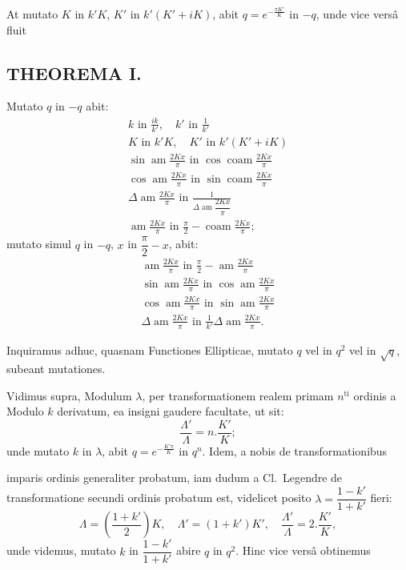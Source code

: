 \documentclass{article}
\begin{document}
At mutato $K$ in $k'K$, $K'$ in $k'(K'+iK)$, abit $q=e^{-\frac{\pi K'}{K}}$ in $-q$, unde vice versâ fluit

\subsection*{THEOREMA I.}

Mutato $q$ in $-q$ abit:
\[
\begin{gathered}
k\text{ in }\frac{ik}{k'},\quad k'\text{ in }\frac{1}{k'}
\\[2ex]
K\text{ in }k'K,\quad K'\text{ in }k'(K'+iK)
\\[2ex]
\sin\operatorname{am}\frac{2Kx}{\pi}\text{ in }\cos\operatorname{coam}\frac{2Kx}{\pi}
\\[2ex]
\cos\operatorname{am}\frac{2Kx}{\pi}\text{ in }\sin\operatorname{coam}\frac{2Kx}{\pi}
\\[2ex]
\Delta\operatorname{am}\frac{2Kx}{\pi}\text{ in }\frac{1}{\Delta\operatorname{am}\dfrac{2Kx}{\pi}}
\\[2ex]
\operatorname{am}\frac{2Kx}{\pi}\text{ in }\frac{\pi}{2}-\operatorname{coam}\frac{2Kx}{\pi};
\end{gathered}
\]
mutato simul $q$ in $-q$, $x$ in $\dfrac{\pi}{2}-x$, abit:
\[
\begin{gathered}
\operatorname{am}\frac{2Kx}{\pi}\text{ in }\frac{\pi}{2}-\operatorname{am}\frac{2Kx}{\pi}
\\[2ex]
\sin\operatorname{am}\frac{2Kx}{\pi}\text{ in }\cos\operatorname{am}\frac{2Kx}{\pi}
\\[2ex]
\cos\operatorname{am}\frac{2Kx}{\pi}\text{ in }\sin\operatorname{am}\frac{2Kx}{\pi}
\\[2ex]
\Delta\operatorname{am}\frac{2Kx}{\pi}\text{ in }\frac{1}{k'}\Delta\operatorname{am}\frac{2Kx}{\pi}.
\end{gathered}
\]

Inquiramus adhuc, quasnam Functiones Ellipticae, mutato $q$ vel in $q^{2}$ vel in $\sqrt{q}$, subeant mutationes.

Vidimus supra, Modulum $\lambda$, per transformationem realem primam $n^{\mathrm{ti}}$ ordinis a Modulo $k$ derivatum, ea insigni gaudere facultate, ut sit:
\[
\frac{\Lambda'}{\Lambda}=n.\frac{K'}{K};
\]
unde mutato $k$ in $\lambda$, abit $q=e^{-\frac{K'\pi}{K}}$ in $q^{n}$. Idem, a nobis de transformationibus

imparis ordinis generaliter probatum, iam dudum a Cl.\ Legendre de transformatione secundi ordinis probatum est, videlicet posito $\lambda=\dfrac{1-k'}{1+k'}$ fieri:
\[
\Lambda=\left(\frac{1+k'}{2}\right)K,\quad\Lambda'=(1+k')K',\quad\frac{\Lambda'}{\Lambda}=2.\frac{K'}{K},
\]
unde videmus, mutato $k$ in $\dfrac{1-k'}{1+k'}$ abire $q$ in $q^{2}$. Hinc vice versâ obtinemus
\end{document}

